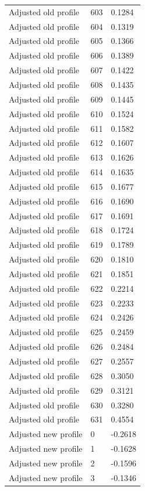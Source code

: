 \begin{table}[htbp]
\begin{tabular}{lll}
Adjusted old profile & 603 & 0.1284 \\
Adjusted old profile & 604 & 0.1319 \\
Adjusted old profile & 605 & 0.1366 \\
Adjusted old profile & 606 & 0.1389 \\
Adjusted old profile & 607 & 0.1422 \\
Adjusted old profile & 608 & 0.1435 \\
Adjusted old profile & 609 & 0.1445 \\
Adjusted old profile & 610 & 0.1524 \\
Adjusted old profile & 611 & 0.1582 \\
Adjusted old profile & 612 & 0.1607 \\
Adjusted old profile & 613 & 0.1626 \\
Adjusted old profile & 614 & 0.1635 \\
Adjusted old profile & 615 & 0.1677 \\
Adjusted old profile & 616 & 0.1690 \\
Adjusted old profile & 617 & 0.1691 \\
Adjusted old profile & 618 & 0.1724 \\
Adjusted old profile & 619 & 0.1789 \\
Adjusted old profile & 620 & 0.1810 \\
Adjusted old profile & 621 & 0.1851 \\
Adjusted old profile & 622 & 0.2214 \\
Adjusted old profile & 623 & 0.2233 \\
Adjusted old profile & 624 & 0.2426 \\
Adjusted old profile & 625 & 0.2459 \\
Adjusted old profile & 626 & 0.2484 \\
Adjusted old profile & 627 & 0.2557 \\
Adjusted old profile & 628 & 0.3050 \\
Adjusted old profile & 629 & 0.3121 \\
Adjusted old profile & 630 & 0.3280 \\
Adjusted old profile & 631 & 0.4554 \\
Adjusted new profile & 0 & -0.2618 \\
Adjusted new profile & 1 & -0.1628 \\
Adjusted new profile & 2 & -0.1596 \\
Adjusted new profile & 3 & -0.1346 \\

\end{tabular}
\end{table}
